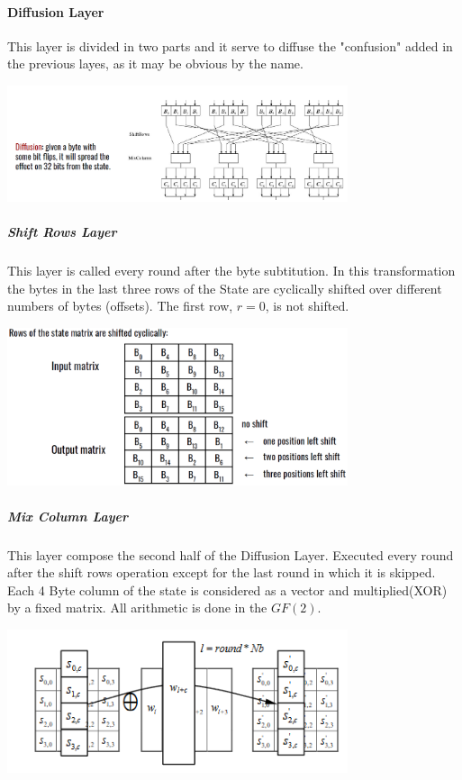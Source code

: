 \documentclass[11 pt]{article}
\begin{document}
\paragraph{Diffusion Layer}
This layer is divided in two parts and it serve to diffuse the "confusion" added in the previous layes, as it may be obvious by the name.
\begin{center}
\includegraphics[width=0.75\textwidth]{Diffusion_Slides.png}
\end{center}
\subparagraph{Shift Rows Layer}
This layer is called every round after the byte subtitution. In this transformation the bytes in the last three rows of the State are cyclically shifted over different numbers of bytes (offsets). The first row, $r = 0$, is not shifted.
\begin{center}
\includegraphics[width=0.75\textwidth]{ShiftRows_Slides.png}
\end{center}
\subparagraph{Mix Column Layer}
This layer compose the second half of the Diffusion Layer. Executed every round after the shift rows operation except for the last round in which it is skipped. 
Each 4 Byte column of the state is considered as a vector and multiplied(XOR) by a fixed matrix.
All arithmetic is done in the $GF(2)$.
\begin{center}
\includegraphics[width=0.75\textwidth]{MixColumns_Slides.png}
\end{center}
\end{document}
